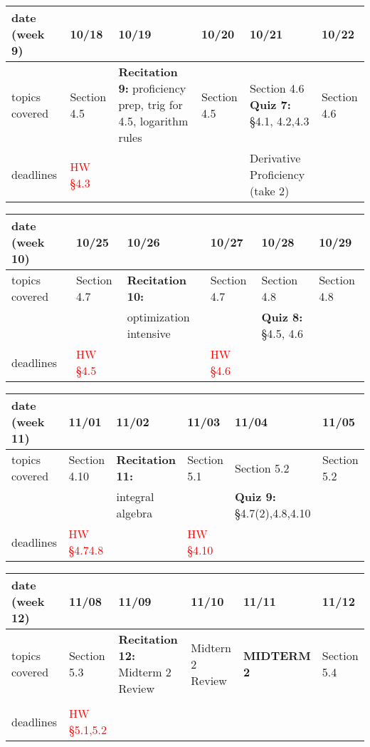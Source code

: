 \documentclass[11pt,fleqn]{article}
\begin{document}
\vfill
\begin{tabularx}{\textwidth}{|X|| X | X | X | X | X |}
\hline
\rowcolor{gray!20}
date (week 9)&10/18&10/19&10/20&10/21&10/22\\ \hline
topics covered&Section 4.5&\textbf{Recitation 9:} proficiency prep, trig for 4.5, logarithm rules&Section 4.5&Section 4.6 \textbf{Quiz 7:} \S 4.1, 4.2,4.3&Section 4.6\\  \hline
deadlines&\textcolor{red}{HW \S 4.3}&&&\textcolor{dcyan}{Derivative Proficiency (take 2)}& \\  \hline
\end{tabularx}
\vfill
\begin{tabularx}{\textwidth}{|X|| X | X | X | X | X |}
\hline
\rowcolor{gray!20}
date (week 10)&10/25&10/26&10/27&10/28&10/29\\ \hline
topics covered&Section 4.7&\textbf{Recitation 10:}&Section 4.7&Section 4.8&Section 4.8\\ 
&&optimization intensive&&\textbf{Quiz 8:} \: \quad \S 4.5, 4.6&\\ \hline
deadlines&\textcolor{red}{HW \S 4.5}&&\textcolor{red}{HW \S 4.6}&& \\ \hline 
\end{tabularx}
\vfill
\begin{tabularx}{\textwidth}{|X|| X | X | X | X | X |}
\hline
\rowcolor{gray!20}
date (week 11)&11/01&11/02&11/03&11/04&11/05\\ \hline
topics covered&Section 4.10&\textbf{Recitation 11:}&Section 5.1&Section 5.2&Section 5.2\\ 
&&integral algebra&&\textbf{Quiz 9:} \S4.7(2),4.8,4.10&\\ \hline
deadlines&\textcolor{red}{HW \S 4.74.8}&&\textcolor{red}{HW \S 4.10}&& \\ \hline 
\end{tabularx}
\vfill
\begin{tabularx}{\textwidth}{|X|| X | X | X | X | X |}
\hline
\rowcolor{gray!20}
date (week 12)&11/08&11/09&11/10&11/11&11/12\\ \hline
topics covered&Section 5.3&\textbf{Recitation 12:} Midterm 2 Review&Midtern 2 Review&\textcolor{dcyan}{\textbf{MIDTERM 2}}&Section 5.4\\ 
&&&&&\\ \hline
deadlines&\textcolor{red}{HW \S 5.1,5.2}&&&& \\ \hline
\end{tabularx}
\vfill
\newpage
\end{document}
